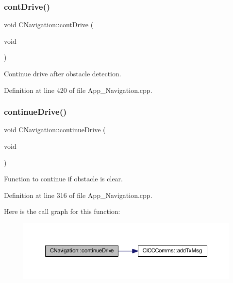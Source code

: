 \subsubsection{\texorpdfstring{contDrive()}{contDrive()}}
{\footnotesize\ttfamily void C\+Navigation\+::cont\+Drive (\begin{DoxyParamCaption}\item[{void}]{ }\end{DoxyParamCaption})\hspace{0.3cm}{\ttfamily [virtual]}}



Continue drive after obstacle detection. 



Definition at line 420 of file App\+\_\+\+Navigation.\+cpp.

\mbox{\label{class_c_navigation_ab3d29f3ab4a8a922f5af439f6d78aded}} 
\subsubsection{\texorpdfstring{continueDrive()}{continueDrive()}}
{\footnotesize\ttfamily void C\+Navigation\+::continue\+Drive (\begin{DoxyParamCaption}\item[{void}]{ }\end{DoxyParamCaption})\hspace{0.3cm}{\ttfamily [virtual]}}



Function to continue if obstacle is clear. 



Definition at line 316 of file App\+\_\+\+Navigation.\+cpp.

Here is the call graph for this function\+:
\nopagebreak
\begin{figure}[H]
\begin{center}
\leavevmode
\includegraphics[width=350pt]{class_c_navigation_ab3d29f3ab4a8a922f5af439f6d78aded_cgraph}
\end{center}
\end{figure}
\mbox{\label{class_c_navigation_a42982842952ac5340b54f43a661673f4}} 
